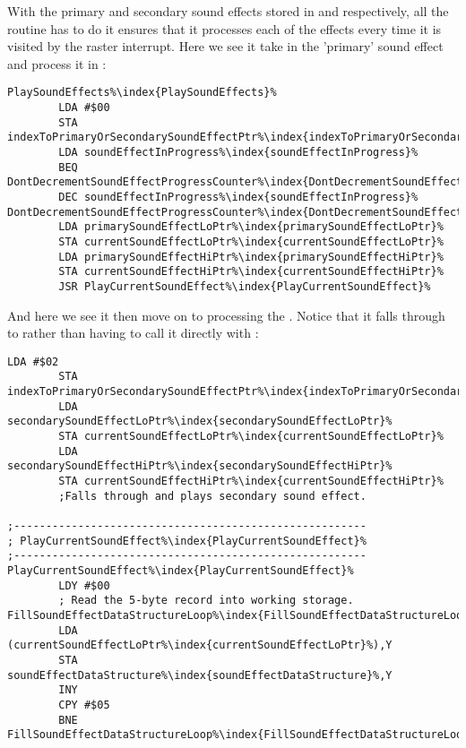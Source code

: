 With the primary and secondary sound effects stored in  and 
respectively, all the  routine has to do it ensures that it processes each of the effects every time it
is visited by the raster interrupt.  Here we see it take in the 'primary' sound effect and process it in :

\begin{lstlisting}[escapechar=\%]
PlaySoundEffects%\index{PlaySoundEffects}%
        LDA #$00
        STA indexToPrimaryOrSecondarySoundEffectPtr%\index{indexToPrimaryOrSecondarySoundEffectPtr}%
        LDA soundEffectInProgress%\index{soundEffectInProgress}%
        BEQ DontDecrementSoundEffectProgressCounter%\index{DontDecrementSoundEffectProgressCounter}%
        DEC soundEffectInProgress%\index{soundEffectInProgress}%
DontDecrementSoundEffectProgressCounter%\index{DontDecrementSoundEffectProgressCounter}%   
        LDA primarySoundEffectLoPtr%\index{primarySoundEffectLoPtr}%
        STA currentSoundEffectLoPtr%\index{currentSoundEffectLoPtr}%
        LDA primarySoundEffectHiPtr%\index{primarySoundEffectHiPtr}%
        STA currentSoundEffectHiPtr%\index{currentSoundEffectHiPtr}%
        JSR PlayCurrentSoundEffect%\index{PlayCurrentSoundEffect}%
\end{lstlisting}

And here we see it then move on to processing the . Notice that it falls through to 
rather than having to call it directly with :

\begin{lstlisting}[escapechar=\%]
        LDA #$02
        STA indexToPrimaryOrSecondarySoundEffectPtr%\index{indexToPrimaryOrSecondarySoundEffectPtr}%
        LDA secondarySoundEffectLoPtr%\index{secondarySoundEffectLoPtr}%
        STA currentSoundEffectLoPtr%\index{currentSoundEffectLoPtr}%
        LDA secondarySoundEffectHiPtr%\index{secondarySoundEffectHiPtr}%
        STA currentSoundEffectHiPtr%\index{currentSoundEffectHiPtr}%
        ;Falls through and plays secondary sound effect.

;-------------------------------------------------------
; PlayCurrentSoundEffect%\index{PlayCurrentSoundEffect}%
;-------------------------------------------------------
PlayCurrentSoundEffect%\index{PlayCurrentSoundEffect}%
        LDY #$00
        ; Read the 5-byte record into working storage.
FillSoundEffectDataStructureLoop%\index{FillSoundEffectDataStructureLoop}%   
        LDA (currentSoundEffectLoPtr%\index{currentSoundEffectLoPtr}%),Y
        STA soundEffectDataStructure%\index{soundEffectDataStructure}%,Y
        INY
        CPY #$05
        BNE FillSoundEffectDataStructureLoop%\index{FillSoundEffectDataStructureLoop}%

\end{lstlisting}

